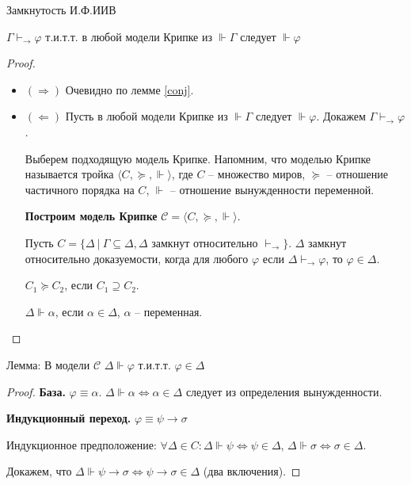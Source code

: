 \documentclass[aspectratio=169]{beamer}
\begin{document}
\begin{frame}{Замкнутость И.Ф.ИИВ}
\begin{thm}
	\label{kripke}
	$\Gamma \vdash_\rightarrow \varphi$ т.и.т.т. в любой модели Крипке из $\Vdash \Gamma$ следует $\Vdash \varphi$
\end{thm}
\begin{proof}\
	\begin{itemize}
		\item $(\Rightarrow)$ Очевидно по лемме \ref{conj}.
		\item $(\Leftarrow)$ Пусть в любой модели Крипке из $\Vdash \Gamma$ следует $\Vdash \varphi$. Докажем $\Gamma \vdash_\rightarrow \varphi$.
		
		Выберем подходящую модель Крипке. Напомним, что моделью Крипке называется тройка $\langle C, \succcurlyeq, \Vdash\rangle$, где $C$ -- множество миров, $\succcurlyeq$ -- отношение частичного порядка на $C$, $\Vdash$ -- отношение вынужденности переменной.
		
		\textbf{Построим модель Крипке} $\mathcal C = \langle C, \succcurlyeq, \Vdash \rangle$. 
		
		Пусть $C = \{\Delta \ |\ \Gamma \subseteq \Delta, \Delta \text{ замкнут относительно }\vdash_\rightarrow\}$. $\Delta$ замкнут относительно доказуемости, когда для любого $\varphi$ если $\Delta \vdash_\rightarrow \varphi$, то $\varphi \in \Delta$.
		
		$C_1 \succcurlyeq C_2$, если $C_1 \supseteq C_2$.
		
		$\Delta \Vdash \alpha$, если $\alpha \in \Delta$, $\alpha$ -- переменная.
	\end{itemize}
\end{proof}
\end{frame}

\begin{frame}{Лемма: В модели $\mathcal C$ $\Delta \Vdash \varphi$ т.и.т.т. $\varphi \in \Delta$}
\begin{proof}
			\textbf{База.} $\varphi \equiv \alpha$. $\Delta \Vdash \alpha \Leftrightarrow \alpha \in \Delta$ следует из определения вынужденности.
			
			\textbf{Индукционный переход.} $\varphi \equiv \psi \rightarrow \sigma$
			
			Индукционное предположение:
			$\forall \Delta \in C: \Delta \Vdash \psi \Leftrightarrow \psi \in \Delta$, $\Delta \Vdash \sigma \Leftrightarrow \sigma \in \Delta$.
			
			Докажем, что $\Delta \Vdash \psi \rightarrow \sigma \Leftrightarrow \psi \rightarrow \sigma \in \Delta$ (два включения).
\end{proof}
\end{frame}
\end{document}
